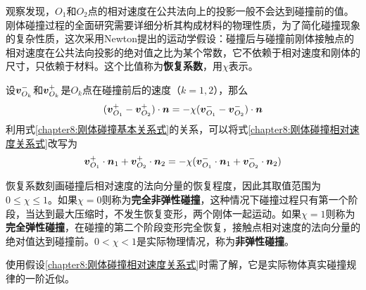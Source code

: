 观察发现，$O_1$和$O_2$点的相对速度在公共法向上的投影一般不会达到碰撞前的值。刚体碰撞过程的全面研究需要详细分析其构成材料的物理性质，为了简化碰撞现象的复杂性质，这次采用Newton提出的运动学假设：碰撞后与碰撞前刚体接触点的相对速度在公共法向投影的绝对值之比为某个常数，它不依赖于相对速度和刚体的尺寸，只依赖于材料。这个比值称为{\bf 恢复系数}，用$\chi$表示。

设$\boldsymbol{v}_{O_k}^-$和$\boldsymbol{v}_{O_k}^+$是$O_k$点在碰撞前后的速度（$k=1,2$），那么
\begin{equation}
	(\boldsymbol{v}_{O_1}^+-\boldsymbol{v}_{O_2}^+) \cdot \boldsymbol{n} = -\chi(\boldsymbol{v}_{O_1}^--\boldsymbol{v}_{O_2}^-) \cdot \boldsymbol{n}
	\label{chapter8:刚体碰撞相对速度关系式}
\end{equation}
利用式\eqref{chapter8:刚体碰撞基本关系式}的关系，可以将式\eqref{chapter8:刚体碰撞相对速度关系式}改写为
\begin{equation}
	\boldsymbol{v}_{O_1}^+\cdot \boldsymbol{n}_1+\boldsymbol{v}_{O_2}^+\cdot\boldsymbol{n}_2 = -\chi(\boldsymbol{v}_{O_1}^-\cdot \boldsymbol{n}_1+\boldsymbol{v}_{O_2}^-\cdot\boldsymbol{n}_2)
	\label{chapter8:刚体碰撞相对速度关系式2}
\end{equation}

恢复系数刻画碰撞后相对速度的法向分量的恢复程度，因此其取值范围为$0\leqslant \chi \leqslant 1$。如果$\chi=0$则称为{\bf 完全非弹性碰撞}，这种情况下碰撞过程只有第一个阶段，当达到最大压缩时，不发生恢复变形，两个刚体一起运动。如果$\chi=1$则称为{\bf 完全弹性碰撞}，在碰撞的第二个阶段变形完全恢复，接触点相对速度的法向分量的绝对值达到碰撞前。$0<\chi<1$是实际物理情况，称为{\bf 非弹性碰撞}。

使用假设\eqref{chapter8:刚体碰撞相对速度关系式}时需了解，它是实际物体真实碰撞规律的一阶近似。

